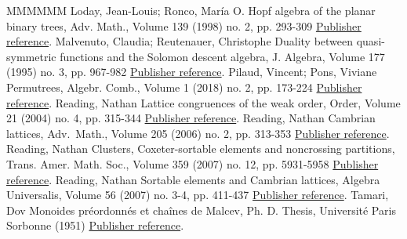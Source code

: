 \documentclass[11pt]{article}
\theoremstyle{definition}
\numberwithin{equation}{section}
\begin{document}
\begin{thebibliography}{MMMMMM}
 Loday, Jean-Louis; Ronco, María O. Hopf algebra of the planar binary trees, Adv. Math., Volume 139 (1998) no. 2, pp. 293-309 \href{https://alco.centre-mersenne.org/articles/10.5802/alco.249/#LodayRonco}{Publisher reference}.
 Malvenuto, Claudia; Reutenauer, Christophe Duality between quasi-symmetric functions and the Solomon descent algebra, J. Algebra, Volume 177 (1995) no. 3, pp. 967-982 \href{https://alco.centre-mersenne.org/articles/10.5802/alco.249/#MalvenutoReutenauer}{Publisher reference}.
 Pilaud, Vincent; Pons, Viviane Permutrees, Algebr. Comb., Volume 1 (2018) no. 2, pp. 173-224 \href{https://alco.centre-mersenne.org/articles/10.5802/alco.249/#PilaudPons-permutrees}{Publisher reference}.
 Reading, Nathan Lattice congruences of the weak order, Order, Volume 21 (2004) no. 4, pp. 315-344 \href{https://alco.centre-mersenne.org/articles/10.5802/alco.249/#Reading-latticeCongruences}{Publisher reference}.
 Reading, Nathan Cambrian lattices, Adv. Math., Volume 205 (2006) no. 2, pp. 313-353 \href{https://alco.centre-mersenne.org/articles/10.5802/alco.249/#Reading-cambrianLattices}{Publisher reference}.
 Reading, Nathan Clusters, Coxeter-sortable elements and noncrossing partitions, Trans. Amer. Math. Soc., Volume 359 (2007) no. 12, pp. 5931-5958 \href{https://alco.centre-mersenne.org/articles/10.5802/alco.249/#Reading-coxeterSortable}{Publisher reference}.
 Reading, Nathan Sortable elements and Cambrian lattices, Algebra Universalis, Volume 56 (2007) no. 3-4, pp. 411-437 \href{https://alco.centre-mersenne.org/articles/10.5802/alco.249/#Reading-sortableElements}{Publisher reference}.
 Tamari, Dov Monoides préordonnés et chaînes de Malcev, Ph. D. Thesis, Université Paris Sorbonne (1951) \href{https://alco.centre-mersenne.org/articles/10.5802/alco.249/#Tamari}{Publisher reference}.
\end{thebibliography}
\end{document}
